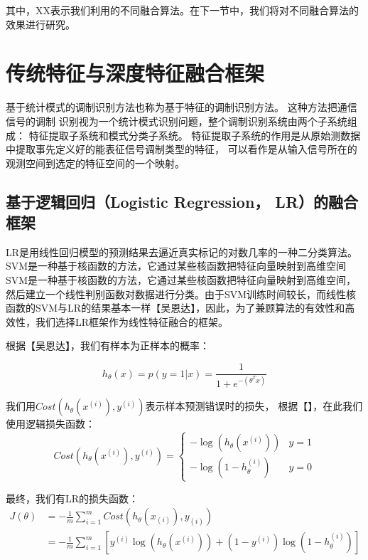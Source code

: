 其中，XX表示我们利用的不同融合算法。在下一节中，我们将对不同融合算法的效果进行研究。


\section{传统特征与深度特征融合框架}

基于统计模式的调制识别方法也称为基于特征的调制识别方法。
这种方法把通信信号的调制
识别视为一个统计模式识别问题，整个调制识别系统由两个子系统组成：
特征提取子系统和模式分类子系统。
特征提取子系统的作用是从原始测数据中提取事先定义好的能表征信号调制类型的特征，
可以看作是从输入信号所在的观测空间到选定的特征空间的一个映射。\par

\subsection{基于逻辑回归（Logistic Regression， LR）的融合框架}
LR是用线性回归模型的预测结果去逼近真实标记的对数几率的一种二分类算法。SVM是一种基于核函数的方法，它通过某些核函数把特征向量映射到高维空间SVM是一种基于核函数的方法，它通过某些核函数把特征向量映射到高维空间，然后建立一个线性判别函数对数据进行分类。由于SVM训练时间较长，而线性核函数的SVM与LR的结果基本一样【吴恩达】，因此，为了兼顾算法的有效性和高效性，我们选择LR框架作为线性特征融合的框架。\par

根据【吴恩达】，我们有样本为正样本的概率：

\begin{equation}
	h_{\theta}(x) = p(y=1|x) = \frac{1}{1 + e^{-(\theta^T x)}}
\end{equation}

我们用$Cost(h_{\theta}(x^{(i)}), y^{(i)}) $表示样本预测错误时的损失，
根据【】，在此我们使用逻辑损失函数：
\begin{equation}
		Cost(h_{\theta}(x^{(i)}), y^{(i)}) = 
			\begin{cases}
				-\log(h_{\theta}(x^{(i)})) & \text{$y = 1$}\\
				-\log(1 - h_{\theta}^{(i)}) & \text{$y = 0$}
			\end{cases}
\end{equation}

最终，我们有LR的损失函数：
\begin{equation}
	\begin{aligned}
		J(\theta) &=- \frac{1}{m} \sum_{i=1}^{m} Cost(h_{\theta}(x_{(i)}), y_{(i)})\\
			&= -\frac{1}{m} \sum_{i=1}^{m} \left[
				y^{(i)} \log(h_{\theta}(x^{(i)})) +
				(1 - y^{(i)})\log(1 - h_{\theta}^{(i)})
			\right]
	\end{aligned}
\end{equation}

